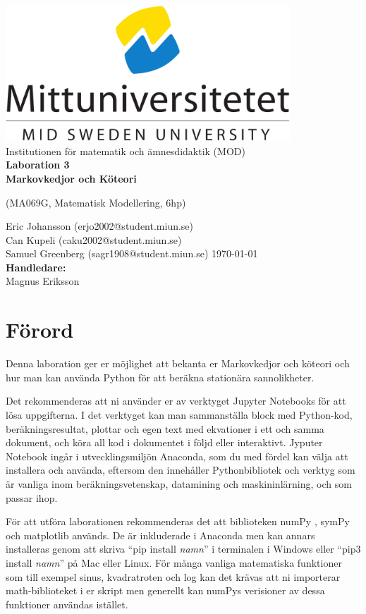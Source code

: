 \documentclass[a4paper]{article}
\makeatletter
\newcommand{\getauthor}{Eric Johansson (erjo2002@student.miun.se)\\
                        Can Kupeli (caku2002@student.miun.se)\\
                        Samuel Greenberg (sagr1908@student.miun.se)} %
\newcommand{\gettitle}{Laboration 3 \\ Markovkedjor och Köteori} %
\newcommand{\getcourse}{(MA069G, Matematisk Modellering, 6hp)} %
\newcommand{\getsupervisor}{Magnus Eriksson}
\makeatother
\begin{document}
\begin{titlepage}
  \begin{center}
    \vspace*{1cm}
    \includegraphics[width=0.8\textwidth]{msu.png}\\[0.5cm]
    \Large
    Institutionen för matematik och ämnesdidaktik (MOD)\\[1cm]
    \Huge
    \textbf{\gettitle}

    \large
    \getcourse{}

    \vspace{1cm}
    \getauthor{}
    \vfill
    \vspace{0.8cm}
    \small
    \today \\
    \Large
    \textbf{Handledare:}\\
    \getsupervisor{}
  \end{center}
\end{titlepage}

\tableofcontents
\newpage

\section{Förord}
Denna laboration ger er möjlighet att bekanta er Markovkedjor och köteori
och hur man kan använda Python för att beräkna stationära sannolikheter.

Det rekommenderas att ni använder er av verktyget Jupyter Notebooks för att lösa
uppgifterna. I det verktyget kan man sammanställa block med Python-kod, beräkningsresultat,
plottar och egen text med ekvationer i ett och samma dokument, och köra all kod i dokumentet
i följd eller interaktivt. Jyputer Notebook ingår i utvecklingsmiljön Anaconda, som du med
fördel kan välja att installera och använda, eftersom den innehåller Pythonbibliotek och
verktyg som är vanliga inom beräkningsvetenskap, datamining och maskininlärning, och som passar ihop.

För att utföra laborationen rekommenderas det att biblioteken numPy \cite{numpy-main},
symPy \cite{sympy-main} och matplotlib \cite{matplotlib-main} används. De är inkluderade i Anaconda men kan annars installeras genom att
skriva ``pip install \textit{namn}'' i terminalen i Windows eller ``pip3 install \textit{namn}'' på Mac eller Linux.
För många vanliga matematiska funktioner som till
exempel sinus, kvadratroten och log kan det krävas att ni importerar math-biblioteket i er skript men generellt kan numPys
verisioner av dessa funktioner användas istället.
\end{document}
